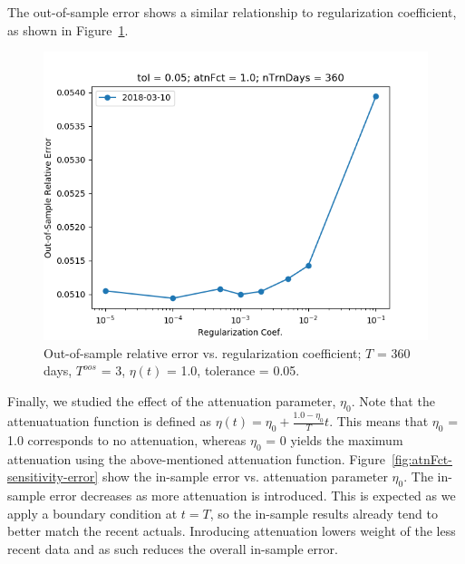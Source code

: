 \documentclass{article}
\begin{document}
The out-of-sample error shows a similar relationship to regularization
coefficient, as shown in
Figure~\ref{fig:regCoef-sensitivity-oos-error}.

\begin{figure}\label{fig:regCoef-sensitivity-oos-error}
\includegraphics[bb=0 0 640 480]{figures/regCoef-sensitivity-oos-error.png}
\caption{Out-of-sample relative error vs. regularization coefficient;
  $T$ = 360 days, $T^{oos}$ = 3, $\eta(t)$ = 1.0, tolerance = 0.05.}
\end{figure}

Finally, we studied the effect of the attenuation parameter,
$\eta_{0}$. Note that the attenuatuation function is defined as
$\eta(t) = \eta_{0} + \frac{1.0 - \eta_{0}}{T} t$. This means that
$\eta_{0}$ = 1.0 corresponds to no attenuation, whereas $\eta_{0}$ = 0
yields the maximum attenuation using the above-mentioned attenuation
function. Figure~\ref{fig:atnFct-sensitivity-error} show the in-sample
error vs. attenuation parameter $\eta_{0}$. The in-sample error
decreases as more attenuation is introduced. This is expected as we
apply a boundary condition at $t = T$, so the in-sample results
already tend to better match the recent actuals. Inroducing
attenuation lowers weight of the less recent data and as such reduces
the overall in-sample error.
\end{document}
